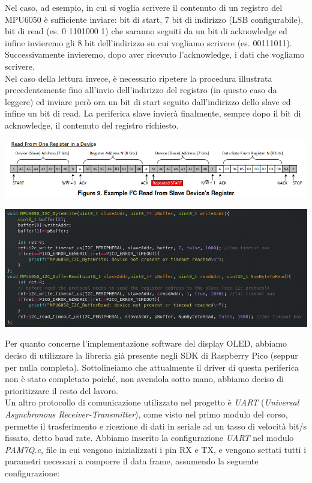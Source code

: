 \noindent Nel caso, ad esempio, in cui si voglia scrivere il contenuto di un
registro del MPU6050 è sufficiente inviare: bit di start, 7 bit di
indirizzo (LSB configurabile), bit di read (es. 0 1101000 1) che saranno
seguiti da un bit di acknowledge ed infine invieremo gli 8 bit
dell'indirizzo su cui vogliamo scrivere (es. 00111011). Successivamente
invieremo, dopo aver ricevuto l'acknowledge, i dati che vogliamo
scrivere.\\
Nel caso della lettura invece, è necessario ripetere la procedura
illustrata precedentemente fino all'invio dell'indirizzo del registro
(in questo caso da leggere) ed inviare però ora un bit di start seguito
dall'indirizzo dello slave ed infine un bit di read. La periferica slave
invierà finalmente, sempre dopo il bit di acknowledge, il contenuto del
registro richiesto.

\begin{center}
\includegraphics[scale=0.65]{figures/image39.png}
\captionsetup{type=figure}
\end{center}

\begin{center}
\includegraphics[scale=0.65]{figures/image35.png}
\captionsetup{type=figure}
\end{center}

\noindent Per quanto concerne l'implementazione software del display OLED, abbiamo
deciso di utilizzare la libreria già presente negli SDK di Raspberry
Pico (seppur per nulla completa). Sottolineiamo che attualmente il
driver di questa periferica non è stato completato poiché, non avendola
sotto mano, abbiamo deciso di prioritizzare il resto del lavoro.\\
Un altro protocollo di comunicazione utilizzato nel progetto è
\emph{UART} (\emph{Universal Asynchronous Receiver-Transmitter}), come
visto nel primo modulo del corso, permette il trasferimento e ricezione
di dati in seriale ad un tasso di velocità bit/s fissato, detto baud
rate. Abbiamo inserito la configurazione \emph{UART} nel modulo
\emph{PAM7Q.c}, file in cui vengono inizializzati i pin RX e TX, e
vengono settati tutti i parametri necessari a comporre il data frame,
assumendo la seguente configurazione:

